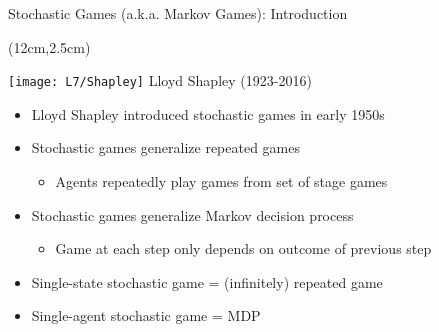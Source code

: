 \documentclass[11pt,aspectratio=169]{beamer}
\begin{document}
  \begin{frame}{Stochastic Games (a.k.a. Markov Games): Introduction}
   \begin{textblock*}{3cm}(12cm,2.5cm)
    \begin{center}\tiny
     \texttt{[image: L7/Shapley]}
     \vspace{5pt}
     Lloyd Shapley (1923-2016)
    \end{center}
   \end{textblock*}
   \vspace{2em}
   \begin{itemize}[<+->]
   \setlength{\itemsep}{1em}
    \item Lloyd Shapley introduced stochastic games in early 1950s
    \item Stochastic games generalize repeated games
    \begin{itemize}
     \item Agents repeatedly play games from set of stage games
    \end{itemize}
    \item Stochastic games generalize Markov decision process
    \begin{itemize}
     \item Game at each step only depends on outcome of previous step
    \end{itemize}
    \item \alert{Single-state} stochastic game = (infinitely) repeated game
    \item \alert{Single-agent} stochastic game = MDP
   \end{itemize}
  \end{frame}
  
\end{document}
